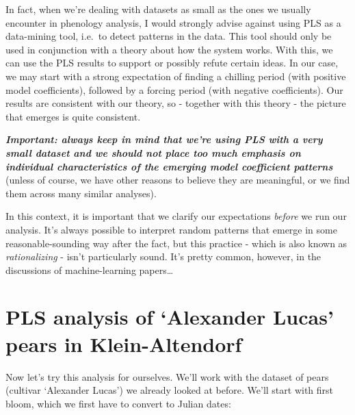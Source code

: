 \documentclass[
]{book}
\begin{document}
In fact, when we're dealing with datasets as small as the ones we usually encounter in phenology analysis, I would strongly advise against using PLS as a data-mining tool, i.e.~to detect patterns in the data. This tool should only be used in conjunction with a theory about how the system works. With this, we can use the PLS results to support or possibly refute certain ideas. In our case, we may start with a strong expectation of finding a chilling period (with positive model coefficients), followed by a forcing period (with negative coefficients). Our results are consistent with our theory, so - together with this theory - the picture that emerges is quite consistent.

\textbf{\emph{Important: always keep in mind that we're using PLS with a very small dataset and we should not place too much emphasis on individual characteristics of the emerging model coefficient patterns}} (unless of course, we have other reasons to believe they are meaningful, or we find them across many similar analyses).

In this context, it is important that we clarify our expectations \emph{before} we run our analysis. It's always possible to interpret random patterns that emerge in some reasonable-sounding way after the fact, but this practice - which is also known as \emph{rationalizing} - isn't particularly sound. It's pretty common, however, in the discussions of machine-learning papers\ldots{}

\hypertarget{pls-analysis-of-alexander-lucas-pears-in-klein-altendorf}{%
\section{PLS analysis of `Alexander Lucas' pears in Klein-Altendorf}\label{pls-analysis-of-alexander-lucas-pears-in-klein-altendorf}}

Now let's try this analysis for ourselves. We'll work with the dataset of pears (cultivar `Alexander Lucas') we already looked at before. We'll start with first bloom, which we first have to convert to Julian dates:
\end{document}
